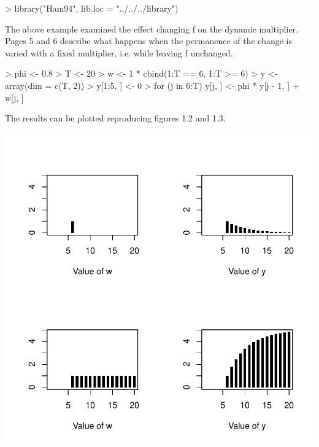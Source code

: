\begin{Schunk}
\begin{Sinput}
> library("Ham94", lib.loc = "../../../library")
\end{Sinput}
\end{Schunk}
The above example examined the effect changing
\textgreek{f}
on the dynamic multiplier.  Pages 5 and 6 
describe what happens when the permanence of the change is varied with a fixed multiplier, i.e.
while leaving
\textgreek{f}
unchanged.
\begin{Schunk}
\begin{Sinput}
> phi <- 0.8
> T <- 20
> w <- 1 * cbind(1:T == 6, 1:T >= 6)
> y <- array(dim = c(T, 2))
> y[1:5, ] <- 0
> for (j in 6:T) y[j, ] <- phi * y[j - 1, ] + w[j, ]
\end{Sinput}
\end{Schunk}
The results can be plotted reproducing figures 1.2 and 1.3.
\begin{center}
\includegraphics{p5-003}
\end{center}
